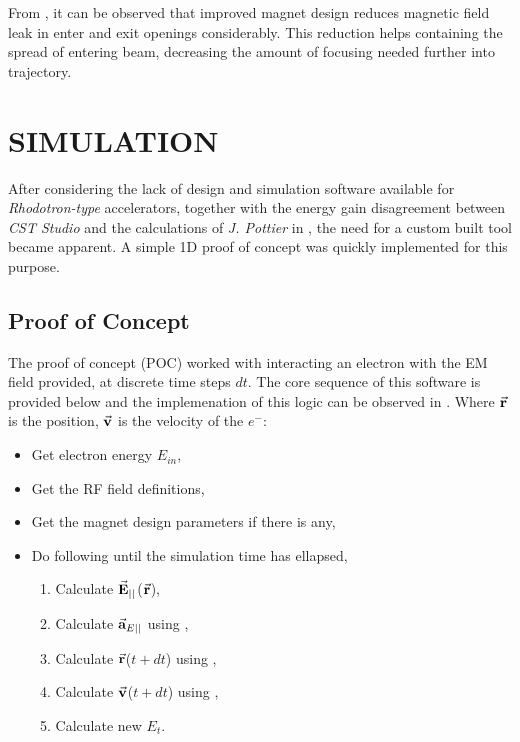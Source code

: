 \documentclass[a4paper,oneside,12pt]{report}
\numberwithin{equation}{chapter}
\begin{document}
\vspace{-10pt}
From , it can be observed that improved magnet design reduces magnetic field leak in enter and exit openings considerably. 
This reduction helps containing the spread of entering beam, decreasing the amount of focusing needed further into trajectory. 



\newpage


\chapter{SIMULATION} \label{ch:simulation}

After considering the lack of design and simulation software available for \textit{Rhodotron-type} accelerators, 
together with the energy gain disagreement between \textit{CST Studio} and the calculations of \textit{J. Pottier} in ,
the need for a custom built tool became apparent. A simple 1D proof of concept was quickly implemented for this purpose.
\section{Proof of Concept}
The proof of concept (POC) worked with interacting an electron with the EM field provided, at discrete time steps $dt$. 
The core sequence of this software is provided below and the implemenation of this logic can be observed in . 
Where $\vec{\textbf{r}}$ is the position, $\vec{\textbf{v}}$ is the velocity of the $e^-$:
\begin{itemize}
    \item Get electron energy $E_{in}$,
    \item Get the RF field definitions,
    \item Get the magnet design parameters if there is any,
    \item Do following until the simulation time has ellapsed,
    \begin{enumerate}
        \item Calculate $\vec{\textbf{E}}_{||}$($\vec{\textbf{r}}$),
        \item Calculate $\vec{\textbf{a}}_{E ||}$ using ,
        \item Calculate $\vec{\textbf{r}}$($t+dt$) using ,
        \item Calculate $\vec{\textbf{v}}$($t+dt$) using ,
        \item Calculate new $E_t$.
    \end{enumerate}
\end{itemize}
\end{document}
